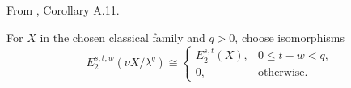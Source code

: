 \begin{definition}
\label{frontier:Literature:e30343a1c6cc}
From \cite{BHS}, Corollary A.11.\par

For $X$ in the chosen classical family and $q>0$, choose isomorphisms\[E_2^{s,t,w}(\nu X/\lambda^q)\cong\begin{cases}E_2^{s,t}(X),&0\le t-w<q,\\0,&\text{otherwise}.\end{cases}\]
\end{definition}

